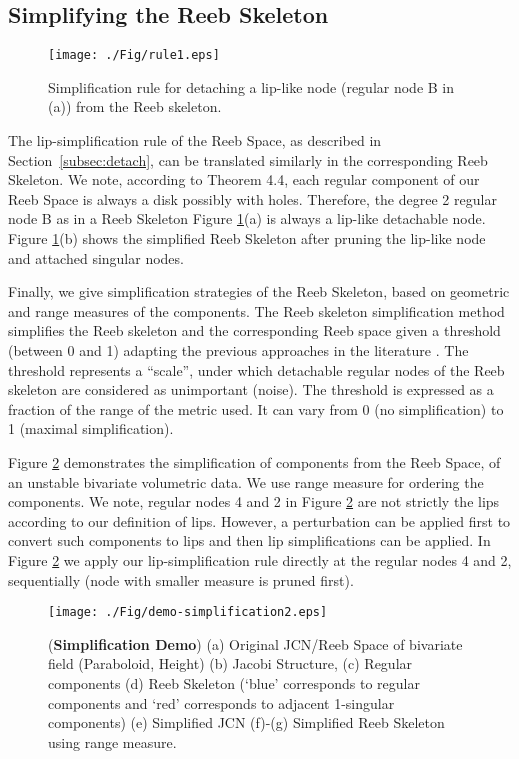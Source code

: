 \documentclass[twocolumn]{article}
\newcommand{\figref}[1]{Figure \ref{fig:#1}}
\begin{document}
\subsection{Simplifying the Reeb Skeleton}
\label{sec:rules}
\begin{figure}[h!]
\begin{center}
\texttt{[image: ./Fig/rule1.eps]}
\caption{Simplification rule for detaching a lip-like node (regular
  node B in (a)) from the Reeb skeleton.}
\label{fig:rules-simplification}
\end{center}
\end{figure}

The lip-simplification rule of the Reeb Space, as described in
Section~\ref{subsec:detach}, can be translated similarly in the
corresponding Reeb Skeleton. We note, according to Theorem 4.4,
 each regular component of our Reeb Space
 is always a disk possibly with holes. Therefore, the degree 2 regular
 node B as in a Reeb Skeleton \figref{rules-simplification}(a) is always a
 lip-like detachable node. \figref{rules-simplification}(b) shows the simplified Reeb
 Skeleton after pruning the lip-like node and attached singular nodes.

Finally, we give simplification strategies of the
Reeb Skeleton, based on geometric and range measures of the
components. The Reeb skeleton simplification method simplifies the Reeb skeleton
and the corresponding Reeb space given a threshold (between 0 and 1) adapting the previous approaches
in the literature \cite{2004-Carr-simplification, 2012-Tierny-tvcg}. The threshold represents a
``scale'', under which detachable regular nodes of the Reeb skeleton
are considered as unimportant (noise).
The threshold is expressed as a fraction of the range of the metric used. It can vary from 0 (no simplification) to 1
(maximal simplification). 


\figref{demo-simplification} demonstrates the simplification
of components from the  Reeb Space, of  an unstable bivariate
volumetric data. We use range measure for ordering the components.
We note, regular nodes 4  and 2 in \figref{demo-simplification} are not strictly the lips according to our
definition of lips. However, a perturbation can be applied first 
to convert such components to lips and then lip
simplifications can be applied. In \figref{demo-simplification} we apply our lip-simplification rule  
directly at the regular nodes 4  and 2, sequentially (node with
smaller measure is pruned first).

\begin{figure}[t]
\begin{center}
\texttt{[image: ./Fig/demo-simplification2.eps]}
\caption{(\textbf{Simplification Demo}) (a) Original  JCN/Reeb Space of bivariate field (Paraboloid, Height) 
  (b) Jacobi Structure, (c) Regular components (d) Reeb Skeleton (`blue'
  corresponds to regular components and `red'
  corresponds to adjacent 1-singular components)  (e)
  Simplified JCN
  (f)-(g) Simplified Reeb Skeleton using range measure.}
\label{fig:demo-simplification}
\end{center}
\end{figure}
\end{document}
